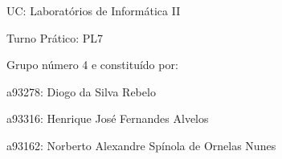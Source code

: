 UC\+: Laboratórios de Informática II

Turno Prático\+: P\+L7

Grupo número 4 e constituído por\+:

a93278\+: Diogo da Silva Rebelo

a93316\+: Henrique José Fernandes Alvelos

a93162\+: Norberto Alexandre Spínola de Ornelas Nunes 